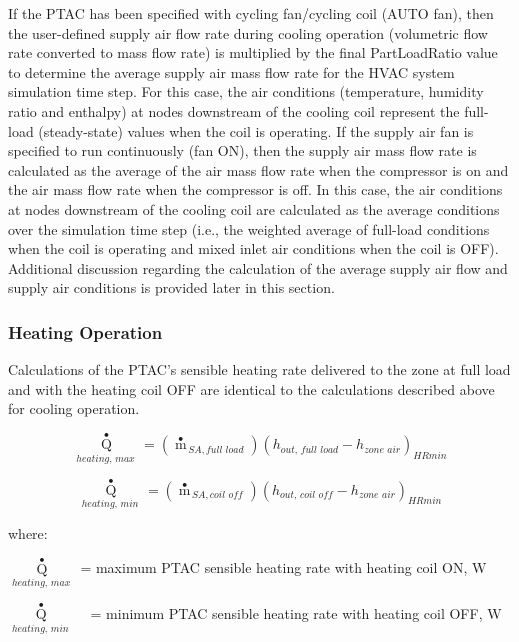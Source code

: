 If the PTAC has been specified with cycling fan/cycling coil (AUTO fan), then the user-defined supply air flow rate during cooling operation (volumetric flow rate converted to mass flow rate) is multiplied by the final PartLoadRatio value to determine the average supply air mass flow rate for the HVAC system simulation time step. For this case, the air conditions (temperature, humidity ratio and enthalpy) at nodes downstream of the cooling coil represent the full-load (steady-state) values when the coil is operating. If the supply air fan is specified to run continuously (fan ON), then the supply air mass flow rate is calculated as the average of the air mass flow rate when the compressor is on and the air mass flow rate when the compressor is off. In this case, the air conditions at nodes downstream of the cooling coil are calculated as the average conditions over the simulation time step (i.e., the weighted average of full-load conditions when the coil is operating and mixed inlet air conditions when the coil is OFF). Additional discussion regarding the calculation of the average supply air flow and supply air conditions is provided later in this section.

\subsubsection{Heating Operation}\label{heating-operation-000}

Calculations of the PTAC's sensible heating rate delivered to the zone at full load and with the heating coil OFF are identical to the calculations described above for cooling operation.

\begin{equation}
{\mathop Q\limits^ \bullet_{heating,\,max\,}} = \left( {{{\mathop m\limits^ \bullet  }_{\,SA,full\,\,load}}} \right){\left( {{h_{out,\,full\,\,load}} - {h_{zone\,\,air}}} \right)_{HRmin}}
\end{equation}

\begin{equation}
{\mathop Q\limits^ \bullet_{heating,\,min\,}} = \left( {{{\mathop m\limits^ \bullet  }_{\,SA,coil\,\,off}}} \right){\left( {{h_{out,\,coil\,\,off}} - {h_{zone\,\,air}}} \right)_{HRmin}}
\end{equation}

where:

\({\mathop Q\limits^ \bullet_{heating,\,max\,}}\) = maximum PTAC sensible heating rate with heating coil ON, W

\({\mathop Q\limits^ \bullet_{heating,\,min\,}}\) ~ = minimum PTAC sensible heating rate with heating coil OFF, W

